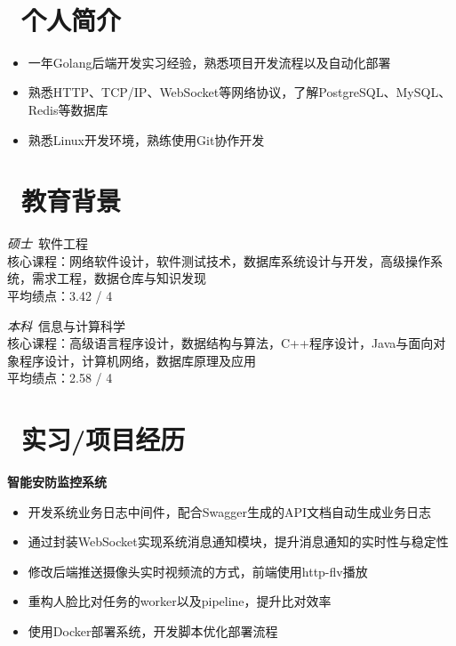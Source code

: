 \documentclass{resume}
\begin{document}


  \centerline { \textperiodcentered\ 
  }

\section{\faUsers\ 个人简介}
\begin{itemize}
  \item 一年Golang后端开发实习经验，熟悉项目开发流程以及自动化部署
  \item 熟悉HTTP、TCP/IP、WebSocket等网络协议，了解PostgreSQL、MySQL、Redis等数据库
  \item 熟悉Linux开发环境，熟练使用Git协作开发
\end{itemize}

\section{\faGraduationCap\ 教育背景}
\textit{硕士}\ 软件工程
\\核心课程：网络软件设计，软件测试技术，数据库系统设计与开发，高级操作系统，需求工程，数据仓库与知识发现
\\平均绩点：3.42 / 4

\textit{本科}\ 信息与计算科学
\\核心课程：高级语言程序设计，数据结构与算法，C++程序设计，Java与面向对象程序设计，计算机网络，数据库原理及应用
\\平均绩点：2.58 / 4


\section{\faBriefcase\ 实习/项目经历}
\textbf{智能安防监控系统}
\begin{itemize}
  \item 开发系统业务日志中间件，配合Swagger生成的API文档自动生成业务日志
  \item 通过封装WebSocket实现系统消息通知模块，提升消息通知的实时性与稳定性
  \item 修改后端推送摄像头实时视频流的方式，前端使用http-flv播放
  \item 重构人脸比对任务的worker以及pipeline，提升比对效率
  \item 使用Docker部署系统，开发脚本优化部署流程
\end{itemize}
\end{document}
